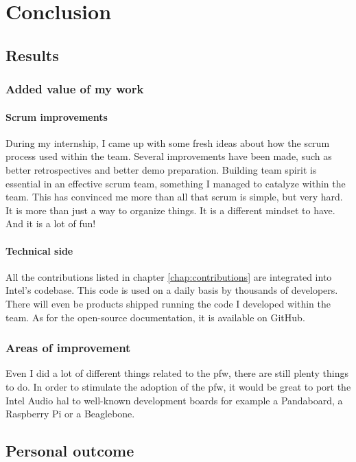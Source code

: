 \chapter{Conclusion}

\section{Results}

\subsection{Added value of my work}
\subsubsection{Scrum improvements}
During my internship, I came up with some fresh ideas about how the \gls{scrum} process used within the team.
Several improvements have been made, such as better retrospectives and better demo preparation.
Building team spirit is essential in an effective \gls{scrum} team, something I managed to catalyze within the team.
This has convinced me more than all that \gls{scrum} is simple, but very hard. It is more than just a way to organize
things. It is a different mindset to have. And it is a lot of fun!

\subsubsection{Technical side}
All the contributions listed in chapter \ref{chap:contributions} are integrated into Intel's codebase.
This code is used on a daily basis by thousands of developers. There will even be products shipped running the
code I developed within the team.
As for the open-source documentation, it is available on \gls{GitHub}.

\subsection{Areas of improvement}
Even I did a lot of different things related to the \gls{pfw}, there are still plenty things to do.
In order to stimulate the adoption of the \gls{pfw}, it would be great to
port the Intel Audio \gls{hal} to well-known development boards for example a
Pandaboard, a Raspberry Pi or a Beaglebone.


\section{Personal outcome}

